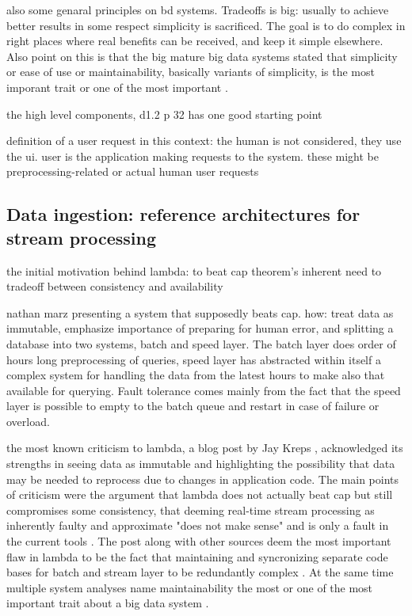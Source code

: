 also some genaral principles on bd systems. Tradeoffs is big: usually to achieve better results in some respect simplicity is sacrificed. The goal is to do complex in right places where real benefits can be received, and keep it simple elsewhere. Also point on this is that the big mature big data systems stated that simplicity or ease of use or maintainability, basically variants of simplicity, is the most imporant trait or one of the most important \cite{facebook} \cite{storm@twitter}.

the high level components, d1.2 p 32 has one good starting point

definition of a user request in this context: the human is not considered, they use the ui. user is the application making requests to the system. these might be preprocessing-related or actual human user requests


\subsection{Data ingestion: reference architectures for stream processing}

the initial motivation behind lambda: to beat cap theorem's inherent need to tradeoff between consistency and availability \cite{lambdakappa}

nathan marz presenting a system that supposedly beats cap. how: treat data as immutable, emphasize importance of preparing for human error, and splitting a database into two systems, batch and speed layer. The batch layer does order of hours long preprocessing of queries, speed layer has  abstracted within itself a complex system for handling the data from the latest hours to make also that available for querying. Fault tolerance comes mainly from the fact that the speed layer is possible to empty to the batch queue and restart in case of failure or overload.

the most known criticism to lambda, a blog post by Jay Kreps \cite{questioninglambda}, acknowledged its strengths in seeing data as immutable and highlighting the possibility that data may be needed to reprocess due to changes in application code. The main points of criticism were the argument that lambda does not actually beat cap but still compromises some consistency, that deeming real-time stream processing as inherently faulty and approximate "does not make sense" and is only a fault in the current tools \cite{questioninglambda}. The post along with other sources deem the most important flaw in lambda to be the fact that maintaining and syncronizing separate code bases for batch and stream layer to be redundantly complex \cite{uber} \cite{facebook}. At the same time multiple system analyses name maintainability the most or one of the most important trait about a big data system \cite{facebook} \cite{storm@twitter}.

